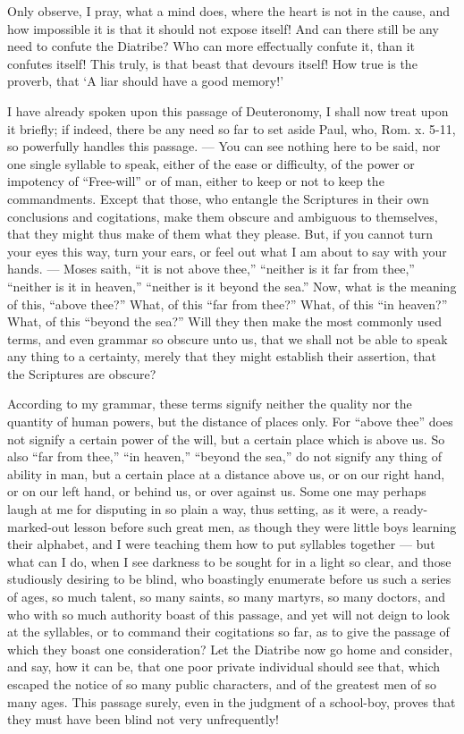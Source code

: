Only observe, I pray, what a mind does, where the heart is not in the cause, and how impossible it is that it should not expose itself! And can there still be any need to confute the Diatribe? Who can more effectually confute it, than it confutes itself! This truly, is that beast that devours itself! How true is the proverb, that ‘A liar should have a good memory!’

I have already spoken upon this passage of Deuteronomy, I shall now treat upon it briefly; if indeed, there be any need so far to set aside Paul, who, Rom. x. 5-11, so powerfully handles this passage. — You can see nothing here to be said, nor one single syllable to speak, either of the ease or difficulty, of the power or impotency of “Free-will” or of man, either to keep or not to keep the commandments. Except that those, who entangle the Scriptures in their own conclusions and cogitations, make them obscure and ambiguous to themselves, that they might thus make of them what they please. But, if you cannot turn your eyes this way, turn your ears, or feel out what I am about to say with your hands. — Moses saith, “it is not above thee,” “neither is it far from thee,” “neither is it in heaven,” “neither is it beyond the sea.” Now, what is the meaning of this, “above thee?” What, of this “far from thee?” What, of this “in heaven?” What, of this “beyond the sea?” Will they then make the most commonly used terms, and even grammar so obscure unto us, that we shall not be able to speak any thing to a certainty, merely that they might establish their assertion, that the Scriptures are obscure?

According to my grammar, these terms signify neither the quality nor the quantity of human powers, but the distance of places only. For “above thee” does not signify a certain power of the will, but a certain place which is above us. So also “far from thee,” “in heaven,” “beyond the sea,” do not signify any thing of ability in man, but a certain place at a distance above us, or on our right hand, or on our left hand, or behind us, or over against us. Some one may perhaps laugh at me for disputing in so plain a way, thus setting, as it were, a ready-marked-out lesson before such great men, as though they were little boys learning their alphabet, and I were teaching them how to put syllables together — but what can I do, when I see darkness to be sought for in a light so clear, and those studiously desiring to be blind, who boastingly enumerate before us such a series of ages, so much talent, so many saints, so many martyrs, so many doctors, and who with so much authority boast of this passage, and yet will not deign to look at the syllables, or to command their cogitations so far, as to give the passage of which they boast one consideration? Let the Diatribe now go home and consider, and say, how it can be, that one poor private individual should see that, which escaped the notice of so many public characters, and of the greatest men of so many ages. This passage surely, even in the judgment of a school-boy, proves that they must have been blind not very unfrequently!

